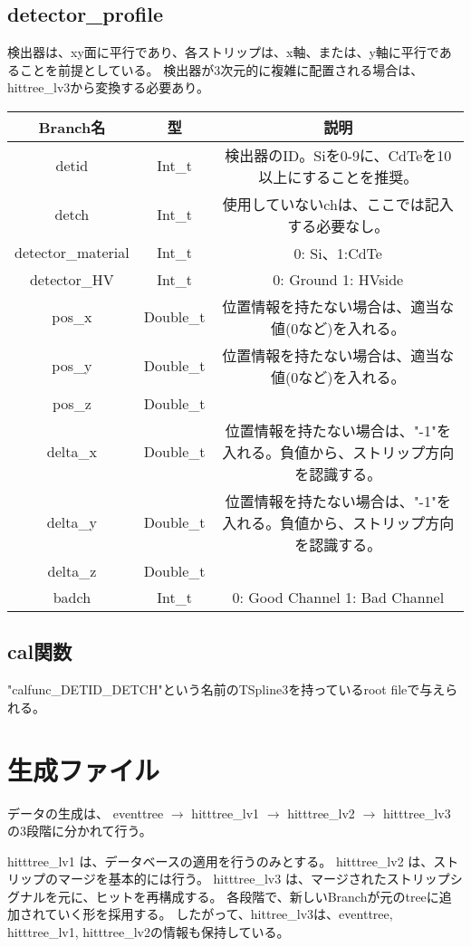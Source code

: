 \documentclass[10.5pt]{jsarticle}
\begin{document}
\subsection{detector\_profile}
検出器は、xy面に平行であり、各ストリップは、x軸、または、y軸に平行であることを前提としている。
検出器が3次元的に複雑に配置される場合は、hittree\_lv3から変換する必要あり。
\begin{table}[htb]
  \begin{tabular}{|c|c|c|} \hline
  Branch名 & 型 & 説明 \\ \hline
  detid & Int\_t  & 検出器のID。Siを0-9に、CdTeを10以上にすることを推奨。\\
  detch & Int\_t &  使用していないchは、ここでは記入する必要なし。\\
  detector\_material & Int\_t & 0: Si、1:CdTe\\
  detector\_HV & Int\_t & 0: Ground 1: HVside\\
  pos\_x  & Double\_t & 位置情報を持たない場合は、適当な値(0など)を入れる。\\
   pos\_y  & Double\_t & 位置情報を持たない場合は、適当な値(0など)を入れる。\\
   pos\_z  & Double\_t & \\
   delta\_x  & Double\_t & 位置情報を持たない場合は、"-1"を入れる。負値から、ストリップ方向を認識する。\\
   delta\_y  & Double\_t & 位置情報を持たない場合は、"-1"を入れる。負値から、ストリップ方向を認識する。\\
   delta\_z  & Double\_t & \\
   badch & Int\_t & 0: Good Channel 1: Bad Channel \\
   \hline
  \end{tabular}
\end{table}

\subsection{cal関数}
"calfunc\_DETID\_DETCH"という名前のTSpline3を持っているroot fileで与えられる。

\section{生成ファイル}
データの生成は、
eventtree $\to$
hitttree\_lv1 $\to$
hitttree\_lv2 $\to$
hitttree\_lv3
の3段階に分かれて行う。

hitttree\_lv1 は、データベースの適用を行うのみとする。
hitttree\_lv2 は、ストリップのマージを基本的には行う。
hitttree\_lv3 は、マージされたストリップシグナルを元に、ヒットを再構成する。
各段階で、新しいBranchが元のtreeに追加されていく形を採用する。
したがって、hittree\_lv3は、eventtree, hitttree\_lv1, hitttree\_lv2の情報も保持している。
\end{document}
